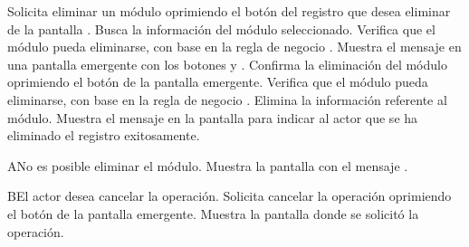  \begin{UCtrayectoria}
    \UCpaso[\UCactor] Solicita eliminar un módulo oprimiendo el botón \btnEliminar del registro que desea eliminar de la pantalla .
    \UCpaso[\UCsist] Busca la información del módulo seleccionado.
    \UCpaso[\UCsist] Verifica que el módulo pueda eliminarse, con base en la regla de negocio . 
    \UCpaso[\UCsist] Muestra el mensaje  en una pantalla emergente con los botones  y .
    \UCpaso[\UCactor] Confirma la eliminación del módulo oprimiendo el botón  de la pantalla emergente. 
    \UCpaso[\UCsist] Verifica que el módulo pueda eliminarse, con base en la regla de negocio . 
    \UCpaso[\UCsist] Elimina la información referente al módulo.
    \UCpaso[\UCsist] Muestra el mensaje  en la pantalla 
    para indicar al actor que se ha eliminado el registro exitosamente.
 \end{UCtrayectoria}
 
 \begin{UCtrayectoriaA}{A}{No es posible eliminar el módulo.}
    \UCpaso[\UCsist] Muestra la pantalla  con el mensaje .
 \end{UCtrayectoriaA}
 \begin{UCtrayectoriaA}{B}{El actor desea cancelar la operación.}
    \UCpaso[\UCactor] Solicita cancelar la operación oprimiendo el botón  de la pantalla emergente.
    \UCpaso[\UCsist] Muestra la pantalla donde se solicitó la operación.
 \end{UCtrayectoriaA} 